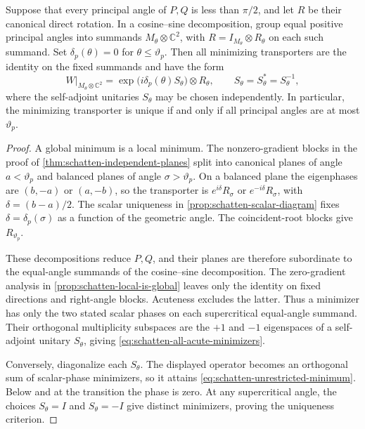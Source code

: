 


\begin{proposition}
\label{prop:schatten-all-acute-minimizers}
Suppose that every principal angle of $P,Q$ is less than $\pi/2$, and let
$R$ be their canonical direct rotation. In a cosine--sine decomposition,
group equal positive principal angles into summands
$M_\theta\otimes\mathbb C^2$, with
$R=I_{M_\theta}\otimes R_\theta$ on each such summand. Set
$\delta_p(\theta)=0$ for $\theta\leq\vartheta_p$.
Then all minimizing transporters are the identity on the fixed summands and
have the form
\begin{equation}
 W\big|_{M_\theta\otimes\mathbb C^2}
       =\exp\bigl(i\delta_p(\theta)S_\theta\bigr)\otimes R_\theta,
 \qquad S_\theta=S_\theta^*=S_\theta^{-1},
 \label{eq:schatten-all-acute-minimizers}
\end{equation}
where the self-adjoint unitaries $S_\theta$ may be chosen independently.
In particular, the minimizing transporter is unique if and only if all
principal angles are at most $\vartheta_p$.
\end{proposition}

\begin{proof}
A global minimum is a local minimum. The nonzero-gradient blocks in the
proof of \cref{thm:schatten-independent-planes} split into canonical
planes of angle $a<\vartheta_p$ and balanced planes of angle
$\sigma>\vartheta_p$. On a balanced plane the eigenphases are $(b,-a)$
or $(a,-b)$, so the transporter is $e^{i\delta}R_\sigma$ or
$e^{-i\delta}R_\sigma$, with $\delta=(b-a)/2$. The scalar uniqueness
in \cref{prop:schatten-scalar-diagram} fixes
$\delta=\delta_p(\sigma)$ as a function of the geometric angle.
The coincident-root blocks give $R_{\vartheta_p}$.

These decompositions reduce $P,Q$, and their planes are therefore
subordinate to the equal-angle summands of the cosine--sine decomposition.
The zero-gradient analysis in \cref{prop:schatten-local-is-global} leaves
only the identity on fixed directions and right-angle blocks. Acuteness
excludes the latter. Thus a minimizer has only the two stated scalar
phases on each supercritical equal-angle summand. Their orthogonal
multiplicity subspaces are the $+1$ and $-1$ eigenspaces of a
self-adjoint unitary $S_\theta$, giving
\cref{eq:schatten-all-acute-minimizers}.

Conversely, diagonalize each $S_\theta$. The displayed operator becomes
an orthogonal sum of scalar-phase minimizers, so it attains
\cref{eq:schatten-unrestricted-minimum}. Below and at the transition
the phase is zero. At any supercritical angle, the choices
$S_\theta=I$ and $S_\theta=-I$ give distinct minimizers, proving the
uniqueness criterion.
\end{proof}

